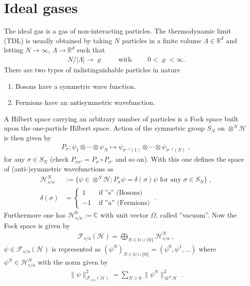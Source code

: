 \documentclass[
a4paper, %
11pt, %
onecolumn, %
openany, %
]{memoir}
\theoremstyle{definition}
\theoremstyle{remark}
\theoremstyle{plain}
\begin{document}
\chapter{Ideal gases}
The ideal gas is a gas of non-interacting particles. The thermodynamic limit (TDL) is usually obtained by taking $N$ particles in a  finite volume $\Lambda\in \mathbb{R}^d$ and letting $N\rightarrow\infty$, $\Lambda\rightarrow\mathbb{R}^d$ such that \begin{align}
N/|\Lambda|\rightarrow \varrho \qquad \text{ with } \qquad 0<\varrho < \infty.
\end{align}
There are two types of indistinguishable particles in nature \begin{enumerate}
	\item Bosons have a symmetric wave function.
	\item Fermions have an antisymmetric wavefunction.
\end{enumerate}
A Hilbert space carrying an arbitrary number of particles is a Fock space built upon the one-particle Hilbert space. Action of the symmetric group $S_N$ on $\otimes^N\mathcal{H}$ is then given by \begin{align}
P_{\sigma}:\psi_1\otimes \cdots \otimes \psi_N \longmapsto {\psi}_{\sigma^{-1}(1)}\otimes \cdots \otimes \psi_{\sigma^{-1}(N)}\; ,
\end{align}
for any $\sigma\in S_N$ (check $P_{\sigma\sigma'}=P_{\sigma}\circ P_{\sigma'}$ and so on). With this one defines the space of (anti-)symmetric wavefunctions as \begin{align}
\mathcal{H}_{s/a}^{N}&:=\{\psi\in\otimes^N\mathcal{H}:P_{\sigma}\psi=\delta(\sigma)\psi \text{ for any } \sigma\in S_N\}\; ,\\\delta(\sigma)&=\begin{cases}
1 &\text{ if ''s'' (Bosons)}\\
-1 &\text{ if ''a'' (Fermions)}
\end{cases}\; .
\end{align}
Furthermore one has $\mathcal{H}_{s/a}^0:=\mathbb{C}$ with unit vector $\Omega$, called ''vacuum''. Now the Fock space is given by \begin{align}
\mathcal{F}_{s/a}(\mathcal{H})=\bigoplus_{N\in\mathbb{N}\cup\{0\}}\mathcal{H}_{s/a}^N\; ,
\end{align}
$\psi\in\mathcal{F}_{s/a}(\mathcal{H})$ is represented as $(\psi^N)_{N\in\mathbb{N}\cup\{0\}}=(\psi^0,\psi^1,\ldots)$ where $\psi^N\in\mathcal{H}^N_{s/a}$ with the norm given by \begin{align}
\|\psi\|^2_{\mathcal{F}_{s/a}(\mathcal{H})}=\sum_{N\geq 0}\|\psi^N\|^2_{\otimes^N\mathcal{H}}\; .
\end{align}
\end{document}
